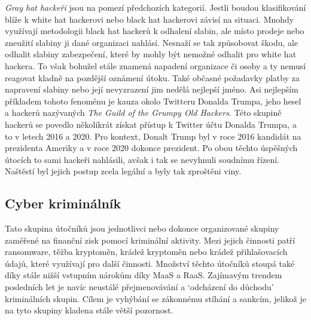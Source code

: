 \textit{Gray hat hackeři} jsou na pomezí předchozích kategorií.
Jestli boudou klasifikování blíže k white hat hackerovi nebo black hat hackerovi závisí na situaci.
Mnohdy využívají metodologii black hat hackerů k odhalení slabin, ale místo prodeje nebo zneužití slabiny ji dané organizaci nahlásí.
Nesnaží se tak způsobovat škodu, ale odhalit slabiny zabezpečení, které by mohly být nemožné odhalit pro white hat hackera.
To však bohužel stále znamená napadení organizace či osoby a ty nemusí reagovat kladně na pozdější oznámení útoku.
Také občasné požadavky platby za napravení slabiny nebo její nevyzrazení jim nedělá nejlepší jméno.
Asi nejlepším příkladem tohoto fenoménu je kauza okolo Twitteru Donalda Trumpa, jeho hesel a hackerů nazývaných \textit{The Guild of the Grumpy Old Hackers}\cite{darknet_87_grumpy}.
Této skupině hackerů se povedlo několikrát získat přístup k Twitter účtu Donalda Trumpa, a to v letech 2016 a 2020.
Pro kontext, Donalt Trump byl v roce 2016 kandidát na prezidenta Ameriky a v roce 2020 dokonce prezident.
Po obou těchto úspěšných útocích to sami hackeři nahlásili, avšak i tak se nevyhnuli soudnímu řízení.
Naštěstí byl jejich postup zcela legální a byly tak zproštěni viny.

\subsection{Cyber kriminálník}\label{subsec:cyber-kriminalnik}
Tato skupina útočníků jsou jednotlivci nebo dokonce organizované skupiny zaměřené na finanční zisk pomocí kriminální aktivity.
Mezi jejich činnosti patří ransomware, těžba kryptoměn, krádež kryptoměn nebo krádež přihlašovacích údajů, které využívají pro další činnosti.
Množství těchto útočníků stoupá také díky stále nižší vstupním nárokům díky \ac{MaaS}\cite{MaaS_ATaT} a \ac{RaaS}\cite{RaaS_microsoft}.
Zajímavým trendem posledních let je navíc neustálé přejmenovávání a `odcházení do důchodu' kriminálních skupin.
Cílem je vyhýbání se zákonnému stíhání a sankcím, jelikož je na tyto skupiny kladena stále větší pozornost.

